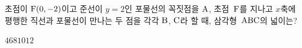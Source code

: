 초점이 $\mathrm{F}(0{,}\mkern3mu\mathopen{}-2)$이고 준선이 $y=2$인 포물선의 꼭짓점을 $\mathrm{A}$, 초점~$\mathrm{F}$를 지나고 $x$축에 평행한 직선과 포물선이 만나는 두 점을 각각 $\mathrm{B}$, $\mathrm{C}$라 할 때, 삼각형~$\mathrm{ABC}$의 넓이는?
\begin{choices32}{$4$}{$6$}{$8$}{$10$}{$12$}\end{choices32}
